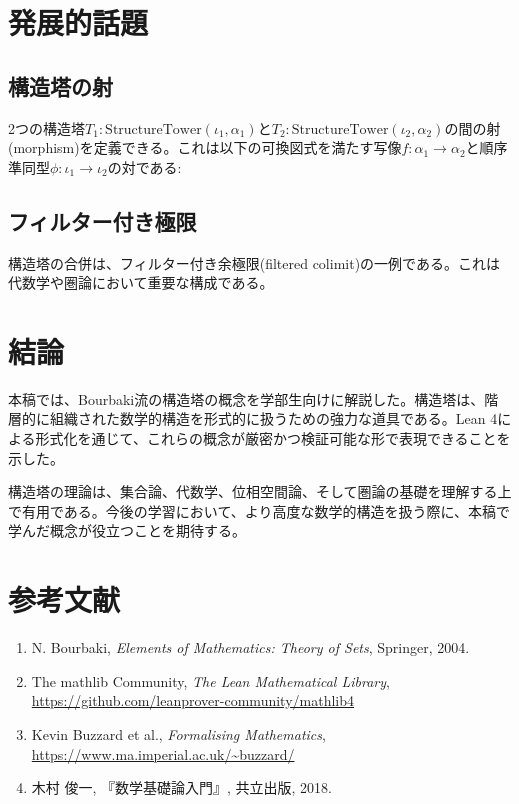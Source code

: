 \documentclass[a4paper,12pt]{article}
\theoremstyle{definition}
\begin{document}
\section{発展的話題}

\subsection{構造塔の射}

2つの構造塔$T_1 : \text{StructureTower}(\iota_1, \alpha_1)$と$T_2 : \text{StructureTower}(\iota_2, \alpha_2)$の間の射(morphism)を定義できる。これは以下の可換図式を満たす写像$f: \alpha_1 \to \alpha_2$と順序準同型$\phi: \iota_1 \to \iota_2$の対である:

\begin{center}
\end{center}

\subsection{フィルター付き極限}

構造塔の合併は、フィルター付き余極限(filtered colimit)の一例である。これは代数学や圏論において重要な構成である。

\section{結論}

本稿では、Bourbaki流の構造塔の概念を学部生向けに解説した。構造塔は、階層的に組織された数学的構造を形式的に扱うための強力な道具である。Lean 4による形式化を通じて、これらの概念が厳密かつ検証可能な形で表現できることを示した。

構造塔の理論は、集合論、代数学、位相空間論、そして圏論の基礎を理解する上で有用である。今後の学習において、より高度な数学的構造を扱う際に、本稿で学んだ概念が役立つことを期待する。

\section*{参考文献}

\begin{enumerate}
\item N. Bourbaki, \textit{Elements of Mathematics: Theory of Sets}, Springer, 2004.
\item The mathlib Community, \textit{The Lean Mathematical Library}, \url{https://github.com/leanprover-community/mathlib4}
\item Kevin Buzzard et al., \textit{Formalising Mathematics}, \url{https://www.ma.imperial.ac.uk/~buzzard/}
\item 木村 俊一, 『数学基礎論入門』, 共立出版, 2018.
\end{enumerate}
\end{document}
